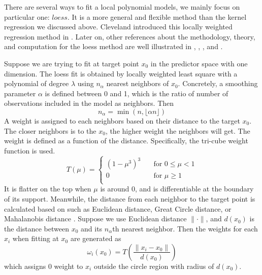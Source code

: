 There are several ways to fit a local polynomial models, we mainly focus on
particular one: $loess$. It is a more general and flexible method than the kernel
regression we discussed above. Cleveland introduced this locally weighted regression
method in \cite{Cleveland:1979}. Later on, other references about the methodology, 
theory, and computation for the loess method are well illustrated in 
\cite{cleveland1988locally}, \cite{cleveland1991computational}, 
\cite{cleveland1988regression}, and \cite{cleveland1996smoothing}. 

Suppose we are trying to fit at target point $x_0$ in the predictor space with
one dimension. The loess fit is obtained by locally weighted least square with a
polynomial of degree $\lambda$ using $n_{\alpha}$ nearest neighbors of $x_0$. 
Concretely, a smoothing parameter $\alpha$ is defined between 0 and 1, which is
the ratio of number of observations included in the model as neighbors. Then 
\begin{equation} 
n_{\alpha} = \min(n, \lfloor \alpha n \rfloor)
\end{equation}
A weight is assigned to each neighbors based on their distance to the target $x_0$.
The closer neighbors is to the $x_0$, the higher weight the neighbors will get. The
weight is defined as a function of the distance. Specifically, the tri-cube weight 
function is used.
\begin{equation} 
T(\mu) =
  \begin{cases}
    (1 - \mu^3)^3       & \quad \text{for } 0 \le \mu < 1\\
    0  & \quad \text{for } \mu \ge 1\\
  \end{cases}
\end{equation}
It is flatter on the top when $\mu$ is around 0, and is differentiable at the 
boundary of its support.
Meanwhile, the distance from each neighbor to the target point is calculated 
based on such as Euclidean distance, Great Circle distance, or Mahalanobis 
distance \cite{mahalanobis1936}. Suppose we use Euclidean distance $\|\cdot\|$, 
and $d(x_0)$ is the distance between $x_0$ and its $n_{\alpha}$th nearest neighbor.
Then the weights for each $x_i$ when fitting at $x_0$ are generated as
\begin{equation} 
\omega_i(x_0) = T \left( \frac{\| x_i - x_0 \|}{d(x_0)} \right)
\end{equation}
which assigns 0 weight to $x_i$ outside the circle region with radius of $d(x_0)$.

